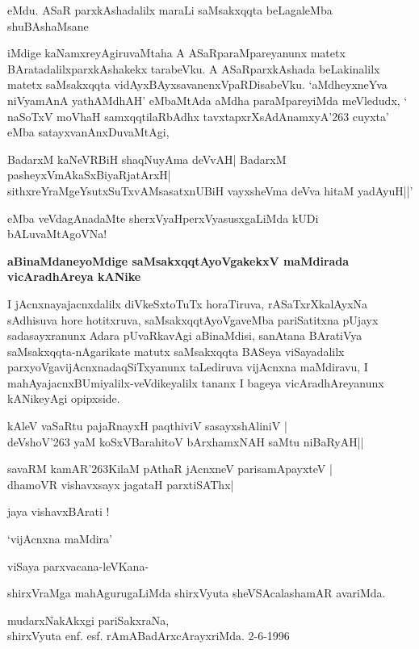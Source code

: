\noindent
eMdu. ASaR parxkAshadalilx maraLi saMsakxqqta beLagaleMba shuBAshaMsane

iMdige kaNamxreyAgiruvaMtaha A ASaRparaMpareyanunx matetx BAratadalilx\break parxkAshakekx tarabeVku. A ASaR\-parxkAshada beLakinalilx matetx saMsakxqqta vidAyxBAyxsa\-vanenxVpaRDisabeVku. `aMdheyxneYva niVyamAnA yathAM\-dhAH\label{63}' eMbaMtAda aMdha paraMpareyiMda meVledudx, ` naSoTxV moVhaH samxqqtilaRbAdhx\label{63} tavxtapxrXsAdAnamxyA\char'263 \-cuyxta' eMba satayxvanAnxDuvaMtAgi,

\begin{shloka}
BadarxM kaNeVRBiH shaqNuyAma deVvAH| BadarxM pasheyxVmAkaSxBiyaRjatArxH|\\\label{63}
sithxreYraMgeYsutxSuTxvAMsasatxnUBiH vayxsheVma deVva hitaM yadAyuH||'
\end{shloka}

\noindent
eMba veVdagAnadaMte sherxVyaHperxVyasusxgaLiMda kUDi bALuvaMtAgoVNa!

{\bigskip
\noindent
{\large\bf aBinaMdaneyoMdige saMsakxqqtAyoVgakekxV maMdirada vicAradhAreya kANike}}\label{page63}
\medskip

\noindent
I jAcnxnayajacnxdalilx diVkeSxtoTuTx horaTiruva, rASaTxrXkalAyxNa sAdhisuva hore hotitx\-ruva, saMsakxqqtA\-yoVga\-veMba pariSatitxna pUjayx sadasayxranunx Adara pUvaRkavAgi aBinaMdisi, sanAtana BAratiVya saMsakxqqta\--nAgari\-kate matutx saMsakxqqta BASeya viSayadalilx parxyoVgavijAcnxnadaqSiTxyanunx taLediruva vijAcnxna maMdi\-ravu, I mahAyajacnxBUmiyalilx-veVdikeyalilx tananx I bageya vicAradhAreyanunx kANikeyAgi opipxside.

\begin{shloka}
kAleV vaSaRtu pajaRnayxH paqthiviV sasayxshAliniV |\\\label{63}
deVshoV\char'263 yaM koSxVBarahitoV bArxhamxNAH saMtu niBaRyAH||
\end{shloka}

\begin{shloka}
savaRM kamAR\char'263KilaM pAthaR jAcnxneV parisamApayxteV |\\\label{63}
dhamoVR vishavxsayx jagataH parxtiSAThx|\label{63}
\end{shloka}

\begin{center}
jaya vishavxBArati !
\end{center}

\hfill `vijAcnxna maMdira'

\medskip
viSaya parxvacana-\hfill leVKana-

shirxVraMga mahAgurugaLiMda \hfill shirxVyuta sheVSAcalashamAR avariMda.

\medskip

\begin{center}
mudarxNakAkxgi pariSakxraNa,\\
shirxVyuta enf. esf. rAmABadArxcArayxriMda. 2-6-1996
\end{center}




